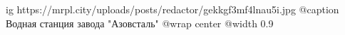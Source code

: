  
 
 
 
 

\ifcmt
  ig https://mrpl.city/uploads/posts/redactor/gekkgf3mf4lnau5i.jpg
	@caption Водная станция завода "Азовсталь"
  @wrap center
  @width 0.9
\fi
